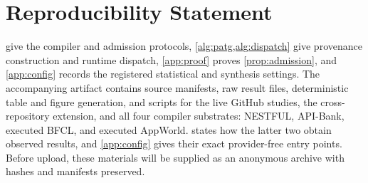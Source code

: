 \documentclass{article}
\theoremstyle{plain}
\theoremstyle{definition}
\begin{document}
\section*{Reproducibility Statement}
 give the compiler and admission protocols,
\cref{alg:patg,alg:dispatch} give provenance construction and runtime dispatch,
\cref{app:proof} proves \cref{prop:admission}, and \cref{app:config} records the
registered statistical and synthesis settings. The accompanying artifact contains source
manifests, raw result files, deterministic table and figure generation, and scripts for
the live GitHub studies, the cross-repository extension, and all four compiler
substrates: NESTFUL, API-Bank, executed BFCL, and executed AppWorld.
 states how the latter two obtain observed results, and
\cref{app:config} gives their exact provider-free entry points. Before upload, these
materials will be supplied as an anonymous archive with hashes and manifests preserved.




\clearpage
\appendix

\end{document}
